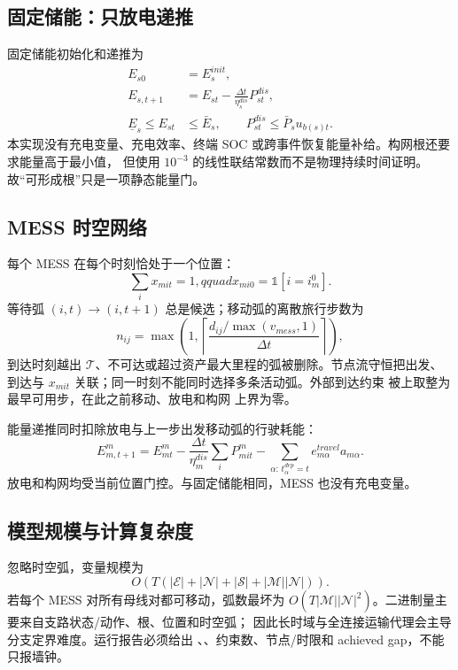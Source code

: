 \subsection{固定储能：只放电递推}

固定储能初始化和递推为
\begin{align}
 E_{s0}&=E_s^{init},\\
 E_{s,t+1}&=E_{st}-\frac{\Delta t}{\eta_s^{dis}}P^{dis}_{st},\\
 \underline E_s\le E_{st}&\le\bar E_s,\qquad
 P^{dis}_{st}\le\bar P_su_{b(s)t}.
\end{align}
本实现没有充电变量、充电效率、终端 SOC 或跨事件恢复能量补给。构网根还要求能量高于最小值，
但使用 $10^{-3}$ 的线性联结常数而不是物理持续时间证明。故“可形成根”只是一项静态能量门。

\subsection{MESS 时空网络}

每个 MESS 在每个时刻恰处于一个位置：
\begin{equation}
 \sum_i x_{mit}=1,qquad x_{mi0}=\mathbb 1[i=i_m^0].
\end{equation}
等待弧 $(i,t)\to(i,t+1)$ 总是候选；移动弧的离散旅行步数为
\begin{equation}
 n_{ij}=\max\!\left(1,\left\lceil
 \frac{d_{ij}/\max(v_{mess},1)}{\Delta t}\right\rceil\right),
\end{equation}
到达时刻越出 $\mathcal T$、不可达或超过资产最大里程的弧被删除。节点流守恒把出发、到达与
$x_{mit}$ 关联；同一时刻不能同时选择多条活动弧。外部到达约束
 被上取整为最早可用步，在此之前移动、放电和构网
上界为零。

能量递推同时扣除放电与上一步出发移动弧的行驶耗能：
\begin{equation}
 E^m_{m,t+1}=E^m_{mt}
 -\frac{\Delta t}{\eta_m^{dis}}\sum_iP^m_{mit}
 -\sum_{\alpha:\,t_\alpha^{dep}=t}e^{travel}_{m\alpha}a_{m\alpha}.
\end{equation}
放电和构网均受当前位置门控。与固定储能相同，MESS 也没有充电变量。

\subsection{模型规模与计算复杂度}

忽略时空弧，变量规模为
\begin{equation}
 O\!\left(T(|\mathcal E|+|\mathcal N|+|\mathcal S|
 +|\mathcal M||\mathcal N|)\right).
\end{equation}
若每个 MESS 对所有母线对都可移动，弧数最坏为
$O(T|\mathcal M||\mathcal N|^2)$。二进制量主要来自支路状态/动作、根、位置和时空弧；
因此长时域与全连接运输代理会主导分支定界难度。运行报告必须给出
、、约束数、节点/时限和 achieved gap，不能只报墙钟。

